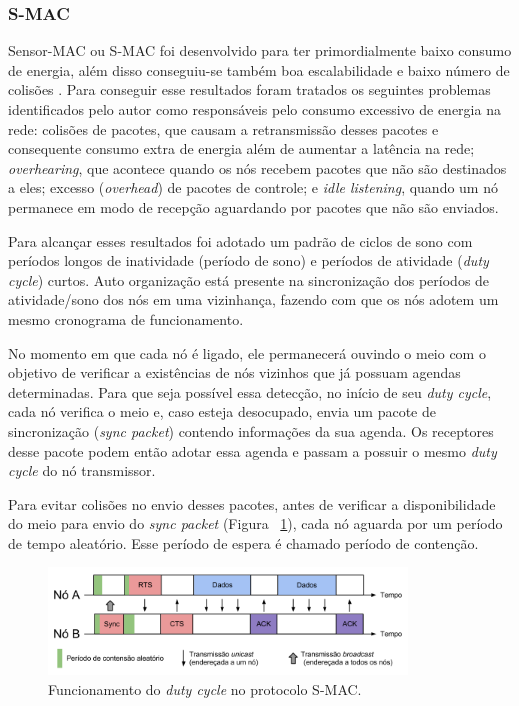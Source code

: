  \subsubsection{S-MAC}
 \label{sec:smac}
 
Sensor-MAC ou S-MAC foi desenvolvido para ter primordialmente baixo consumo de energia, além disso conseguiu-se também boa escalabilidade e baixo número de colisões \cite{ye04}. Para conseguir esse resultados foram tratados os seguintes problemas identificados pelo autor como responsáveis pelo consumo excessivo de energia na rede: colisões de pacotes, que causam a retransmissão desses pacotes e consequente consumo extra de energia além de aumentar a latência na rede; \textit{overhearing}, que acontece quando os nós recebem pacotes que não são destinados a eles; excesso (\textit{overhead}) de pacotes de controle; e \textit{idle listening}, quando um nó permanece em modo de recepção aguardando por pacotes que não são enviados.

Para alcançar esses resultados foi adotado um padrão de ciclos de sono com períodos longos de inatividade (período de sono) e períodos de atividade (\emph{duty cycle}) curtos. Auto organização está presente na sincronização dos períodos de atividade/sono dos nós em uma vizinhança, fazendo com que os nós adotem um mesmo cronograma de funcionamento. 

No momento em que cada nó é ligado, ele permanecerá ouvindo o meio com o objetivo de verificar a existências de nós vizinhos que já possuam agendas determinadas. Para que seja possível essa detecção, no início de seu \emph{duty cycle}, cada nó verifica o meio e, caso esteja desocupado, envia um pacote de sincronização (\emph{sync packet}) contendo informações da sua agenda. Os receptores desse pacote podem então adotar essa agenda e passam a possuir o mesmo \emph{duty cycle} do nó transmissor. 

Para evitar colisões no envio desses pacotes, antes de verificar a disponibilidade do meio para envio do \emph{sync packet} (Figura ~\ref{fig:SmacDutyCycle}), cada nó aguarda por um período de tempo aleatório. Esse período de espera é chamado período de contenção. 

\begin{figure}[!htb]
\centering
\includegraphics[width=360px,height=108px]{./Pictures/S-MACDutyCycle.png}
\caption{Funcionamento do \emph{duty cycle} no protocolo S-MAC.} %
\label{fig:SmacDutyCycle} %
\end{figure}

